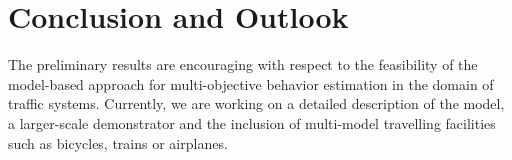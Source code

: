 \documentclass[conference]{../cls/IEEEtran}
\begin{document}
\section{Conclusion and Outlook}

The preliminary results are encouraging with respect to the feasibility of the model-based approach for multi-objective behavior estimation in the domain of traffic systems.
Currently, we are working on a detailed description of the model, a larger-scale demonstrator and the inclusion of multi-model travelling facilities such as bicycles, trains or airplanes.



\end{document}
